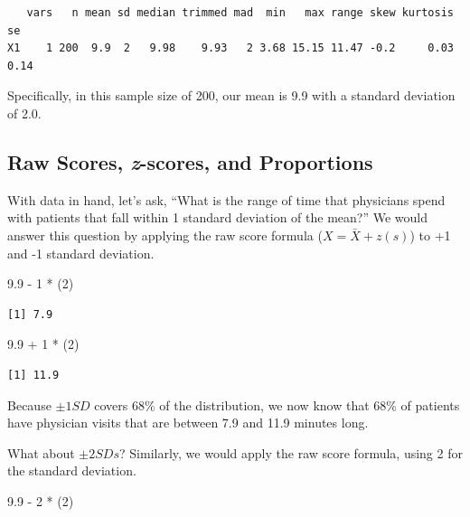 \documentclass[
  11pt,
]{book}
\newenvironment{Shaded}{\begin{snugshade}}{\end{snugshade}}
\newcommand{\DecValTok}[1]{\textcolor[rgb]{0.00,0.00,0.81}{#1}}
\newcommand{\FloatTok}[1]{\textcolor[rgb]{0.00,0.00,0.81}{#1}}
\newcommand{\NormalTok}[1]{#1}
\newcommand{\SpecialCharTok}[1]{\textcolor[rgb]{0.00,0.00,0.00}{#1}}
\begin{document}
\begin{verbatim}
   vars   n mean sd median trimmed mad  min   max range skew kurtosis   se
X1    1 200  9.9  2   9.98    9.93   2 3.68 15.15 11.47 -0.2     0.03 0.14
\end{verbatim}

Specifically, in this sample size of 200, our mean is 9.9 with a standard deviation of 2.0.

\hypertarget{raw-scores-z-scores-and-proportions}{%
\subsection{\texorpdfstring{Raw Scores, \emph{z}-scores, and Proportions}{Raw Scores, z-scores, and Proportions}}\label{raw-scores-z-scores-and-proportions}}

With data in hand, let's ask, ``What is the range of time that physicians spend with patients that fall within 1 standard deviation of the mean?'' We would answer this question by applying the raw score formula (\(X = \bar{X} + z(s)\)) to +1 and -1 standard deviation.

\begin{Shaded}
\begin{Highlighting}[]
\FloatTok{9.9} \SpecialCharTok{{-}} \DecValTok{1} \SpecialCharTok{*}\NormalTok{ (}\DecValTok{2}\NormalTok{)}
\end{Highlighting}
\end{Shaded}

\begin{verbatim}
[1] 7.9
\end{verbatim}

\begin{Shaded}
\begin{Highlighting}[]
\FloatTok{9.9} \SpecialCharTok{+} \DecValTok{1} \SpecialCharTok{*}\NormalTok{ (}\DecValTok{2}\NormalTok{)}
\end{Highlighting}
\end{Shaded}

\begin{verbatim}
[1] 11.9
\end{verbatim}

Because \(\pm 1SD\) covers 68\% of the distribution, we now know that 68\% of patients have physician visits that are between 7.9 and 11.9 minutes long.

What about \(\pm 2SDs\)? Similarly, we would apply the raw score formula, using 2 for the standard deviation.

\begin{Shaded}
\begin{Highlighting}[]
\FloatTok{9.9} \SpecialCharTok{{-}} \DecValTok{2} \SpecialCharTok{*}\NormalTok{ (}\DecValTok{2}\NormalTok{)}
\end{Highlighting}
\end{Shaded}
\end{document}
